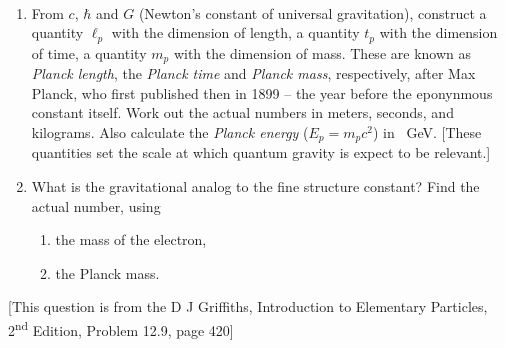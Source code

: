 \documentclass[main.tex]{subfiles}
\begin{document}
\begin{q}{1}
~
\begin{enumerate}[label=\textbf{(\alph*)}]
    \item From $c$, $\hbar$ and $G$ (Newton's constant of universal gravitation), construct a quantity $\ell_p$ with the dimension of length, a quantity $t_p$ with the dimension of time, a quantity $m_p$ with the dimension of mass. These are known as \textit{Planck length}, the  \textit{Planck time} and  \textit{Planck mass}, respectively, after Max Planck, who first published then in 1899 -- the year before the eponynmous constant itself. Work out the actual numbers in meters, seconds, and kilograms. Also calculate the  \textit{Planck energy} ($E_p = m_pc^2$) in \SI{}{\giga\eV}. [These quantities set the scale at which quantum gravity is expect to be relevant.]
    \item What is the gravitational analog to the fine structure constant? Find the actual number, using
    \begin{enumerate}[label=\roman*.]
        \item the mass of the electron,
        \item the Planck mass.
    \end{enumerate}
\end{enumerate}
[This question is from the D J Griffiths, Introduction to Elementary Particles, 2\textsuperscript{nd} Edition, Problem 12.9, page 420]
\end{q}

\begin{sol}

\end{sol}
\end{document}
